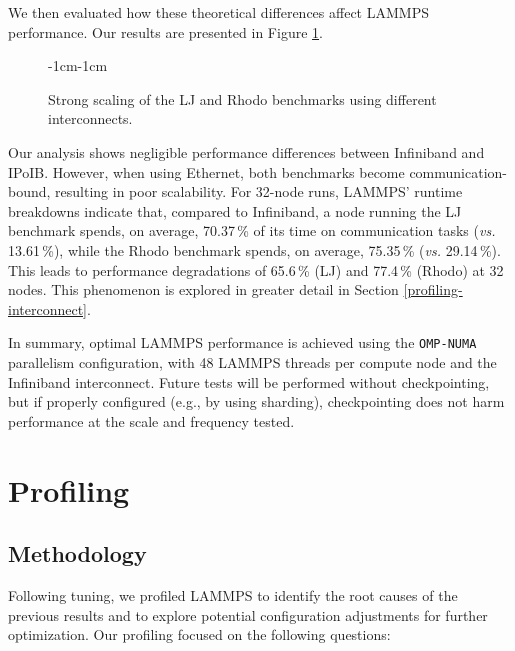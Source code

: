 \documentclass[sigplan, nonacm, screen]{acmart}
\begin{document}
We then evaluated how these theoretical differences affect LAMMPS performance. Our results are
presented in Figure \ref{interconnect-plot}.

\begin{figure}[h]
    \begin{adjustwidth}{-1cm}{-1cm}
        \centering
        
    \end{adjustwidth}
    \caption{Strong scaling of the LJ and Rhodo benchmarks using different interconnects.}
    \label{interconnect-plot}
\end{figure}

Our analysis shows negligible performance differences between Infiniband and IPoIB. However, when
using Ethernet, both benchmarks become communication-bound, resulting in poor scalability. For
32-node runs, LAMMPS' runtime breakdowns indicate that, compared to Infiniband, a node running the
LJ benchmark spends, on average, 70.37\,\% of its time on communication tasks (\emph{vs.}
13.61\,\%), while the Rhodo benchmark spends, on average, 75.35\,\% (\emph{vs.} 29.14\,\%). This
leads to performance degradations of 65.6\,\% (LJ) and 77.4\,\% (Rhodo) at 32 nodes. This phenomenon
is explored in greater detail in Section \ref{profiling-interconnect}.


In summary, optimal LAMMPS performance is achieved using the \texttt{OMP-NUMA} parallelism
configuration, with 48 LAMMPS threads per compute node and the Infiniband interconnect. Future tests
will be performed without checkpointing, but if properly configured (e.g., by using sharding),
checkpointing does not harm performance at the scale and frequency tested.


\section{Profiling} %
\label{profiling}

\subsection{Methodology} %
\label{profiling-methodology}

Following tuning, we profiled LAMMPS to identify the root causes of the previous results and to
explore potential configuration adjustments for further optimization. Our profiling focused on the
following questions:
\end{document}
